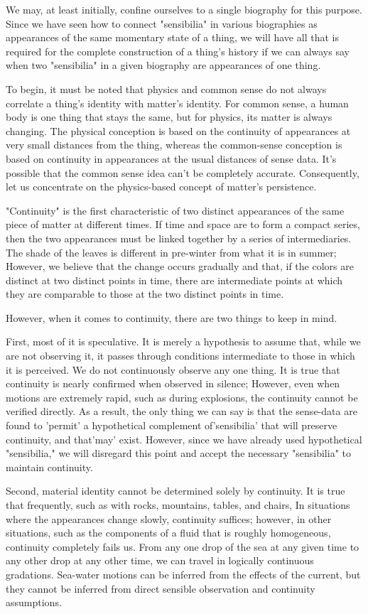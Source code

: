 \documentclass[a4paper,12pt]{book}[2004/02/16]
\theoremstyle{ilemma}
\theoremstyle{itheorem}
\theoremstyle{iother}
\theoremstyle{icorollary}
\theoremstyle{numcorollary}
\theoremstyle{idefinition}
\begin{document}
We may, at least initially, confine ourselves to a single biography for this purpose. Since we have seen how to connect "sensibilia" in various biographies as appearances of the same momentary state of a thing, we will have all that is required for the complete construction of a thing's history if we can always say when two "sensibilia" in a given biography are appearances of one thing.

To begin, it must be noted that physics and common sense do not always correlate a thing's identity with matter's identity. For common sense, a human body is one thing that stays the same, but for physics, its matter is always changing. The physical conception is based on the continuity of appearances at very small distances from the thing, whereas the common-sense conception is based on continuity in appearances at the usual distances of sense data. It's possible that the common sense idea can't be completely accurate. Consequently, let us concentrate on the physics-based concept of matter's persistence.

"Continuity" is the first characteristic of two distinct appearances of the same piece of matter at different times. If time and space are to form a compact series, then the two appearances must be linked together by a series of intermediaries. The shade of
the leaves is different in pre-winter from what it is in summer; However, we believe that the change occurs gradually and that, if the colors are distinct at two distinct points in time, there are intermediate points at which they are comparable to those at the two distinct points in time.

However, when it comes to continuity, there are two things to keep in mind.

First, most of it is speculative. It is merely a hypothesis to assume that, while we are not observing it, it passes through conditions intermediate to those in which it is perceived. We do not continuously observe any one thing. It is true that continuity is nearly confirmed when observed in silence; However, even when motions are extremely rapid, such as during explosions, the continuity cannot be verified directly. As a result, the only thing we can say is that the sense-data are found to 'permit' a hypothetical complement of'sensibilia' that will preserve continuity, and that'may' exist. However, since we have already used hypothetical "sensibilia," we will disregard this point and accept the necessary "sensibilia" to maintain continuity.

Second, material identity cannot be determined solely by continuity. It is true that frequently, such as with rocks, mountains, tables, and chairs, In situations where the appearances change slowly, continuity suffices; however, in other situations, such as the components of a fluid that is roughly homogeneous, continuity completely fails us. From any one drop of the sea at any given time to any other drop at any other time, we can travel in logically continuous gradations. Sea-water motions can be inferred from the effects of the current, but they cannot be inferred from direct sensible observation and continuity assumptions.
\end{document}
